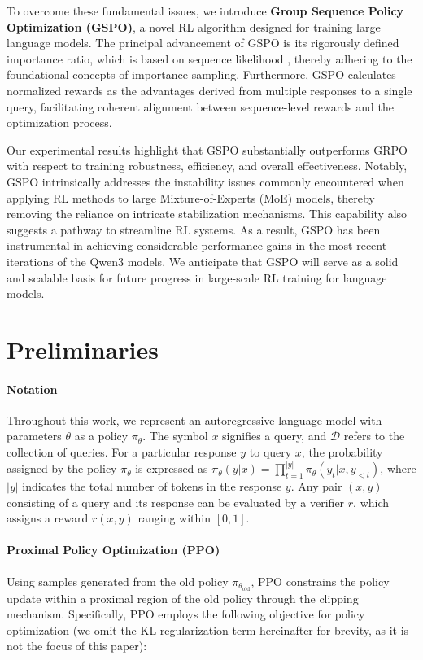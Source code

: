 To overcome these fundamental issues, we introduce \textbf{Group Sequence Policy Optimization (GSPO)}, a novel RL algorithm designed for training large language models. The principal advancement of GSPO is its rigorously defined importance ratio, which is based on sequence likelihood \citep{click}, thereby adhering to the foundational concepts of importance sampling. Furthermore, GSPO calculates normalized rewards as the advantages derived from multiple responses to a single query, facilitating coherent alignment between sequence-level rewards and the optimization process.

Our experimental results highlight that GSPO substantially outperforms GRPO with respect to training robustness, efficiency, and overall effectiveness. Notably, GSPO intrinsically addresses the instability issues commonly encountered when applying RL methods to large Mixture-of-Experts (MoE) models, thereby removing the reliance on intricate stabilization mechanisms. This capability also suggests a pathway to streamline RL systems. As a result, GSPO has been instrumental in achieving considerable performance gains in the most recent iterations of the Qwen3 models. We anticipate that GSPO will serve as a solid and scalable basis for future progress in large-scale RL training for language models.

\section{Preliminaries}

\paragraph{Notation}
Throughout this work, we represent an autoregressive language model with parameters $\theta$ as a policy $\pi_\theta$.
The symbol $x$ signifies a query, and $\mathcal{D}$ refers to the collection of queries. For a particular response $y$ to query $x$, the probability assigned by the policy $\pi_\theta$ is expressed as $\pi_\theta (y | x)=\prod_{t=1}^{|y|} \pi_\theta (y_t | x, y_{<t} )$, where $|y|$ indicates the total number of tokens in the response $y$. Any pair $(x, y)$ consisting of a query and its response can be evaluated by a verifier $r$, which assigns a reward $r(x, y)$ ranging within $[ 0, 1 ]$.

\paragraph{Proximal Policy Optimization (PPO)} Using samples generated from the old policy $\pi_{\theta_\text{old}}$, PPO \citep{ppo} constrains the policy update within a proximal region of the old policy through the clipping mechanism. Specifically, PPO employs the following objective for policy optimization (we omit the KL regularization term hereinafter for brevity, as it is not the focus of this paper):

